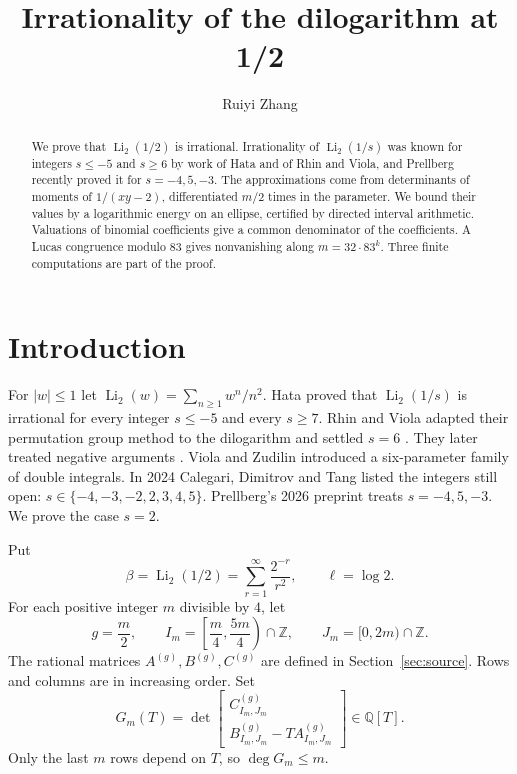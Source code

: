 \documentclass{amsart}
\numberwithin{equation}{section}
\numberwithin{table}{section}
\begin{document}
\title{Irrationality of the dilogarithm at 1/2}
\author{Ruiyi Zhang}
\address{Independent Researcher, Columbia, Maryland, USA}
\begin{abstract}
We prove that $\operatorname{Li}_2(1/2)$ is irrational. Irrationality of
$\operatorname{Li}_2(1/s)$ was known for integers $s\le-5$ and $s\ge6$ by
work of Hata and of Rhin and Viola, and Prellberg recently proved it for
$s=-4,5,-3$. The approximations come from determinants of moments of
$1/(xy-2)$, differentiated $m/2$ times in the parameter. We bound their
values by a logarithmic energy on an ellipse, certified by directed interval
arithmetic. Valuations of binomial coefficients give a common denominator of
the coefficients. A Lucas congruence modulo $83$ gives nonvanishing along
$m=32\cdot83^k$. Three finite computations are part of the proof.
\end{abstract}
\maketitle

\section{Introduction}\label{sec:introduction}

For $|w|\le1$ let $\operatorname{Li}_2(w)=\sum_{n\ge1}w^n/n^2$. Hata
\cite[Theorem~1.1]{Ha} proved that $\operatorname{Li}_2(1/s)$ is irrational
for every integer $s\le-5$ and every $s\ge7$. Rhin and Viola adapted their
permutation group method \cite{RV96} to the dilogarithm and settled $s=6$
\cite{RV05}. They later treated negative arguments \cite{RV19}. Viola and
Zudilin \cite{VZ} introduced a six-parameter family of double integrals. In
2024 Calegari, Dimitrov and Tang \cite[Remark~2.8.2 and Section~15.2]{CDT}
listed the integers still open: $s\in\{-4,-3,-2,2,3,4,5\}$. Prellberg's 2026
preprint \cite{Pr} treats $s=-4,5,-3$. We prove the case $s=2$.

Put
\[
 \beta=\operatorname{Li}_2(1/2)=\sum_{r=1}^{\infty}\frac{2^{-r}}{r^2},
 \qquad \ell=\log 2.
\]
For each positive integer $m$ divisible by $4$, let
\[
 g=\frac m2,\qquad
 I_m=\left[\frac m4,\frac{5m}4\right)\cap\mathbb Z,
 \qquad J_m=[0,2m)\cap\mathbb Z.
\]
The rational matrices $A^{(g)},B^{(g)},C^{(g)}$ are defined in
Section~\ref{sec:source}. Rows and columns are in increasing order. Set
\begin{equation}\label{eq:main-polynomial}
 G_m(T)=\det\begin{bmatrix}
 C^{(g)}_{I_m,J_m}\\
 B^{(g)}_{I_m,J_m}-T A^{(g)}_{I_m,J_m}
 \end{bmatrix}\in\mathbb Q[T].
\end{equation}
Only the last $m$ rows depend on $T$, so $\deg G_m\le m$.
\end{document}
